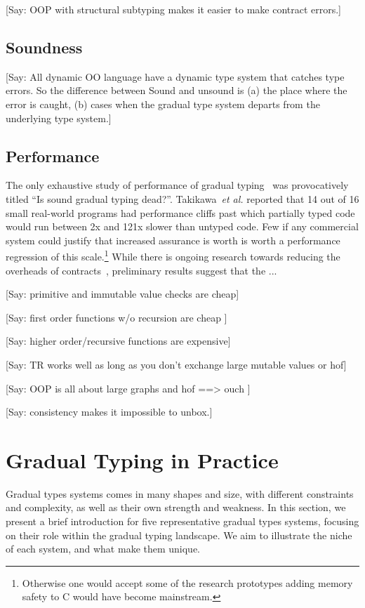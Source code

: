 \documentclass[a4paper,USenglish]{tex/lipics-v2016}
\begin{document}
[Say: OOP with structural subtyping makes it easier to make contract errors.]


\subsection{Soundness}

[Say: All dynamic OO language have a dynamic type system that catches type errors.  
So the difference between Sound and unsound is (a) the place where the error is caught, 
(b) cases when the gradual type system departs from the underlying type system.]  

\subsection{Performance}

The only exhaustive study of performance of gradual typing~\cite{popl16} was
provocatively titled ``Is sound gradual typing dead?''.  Takikawa~\emph{et
  al.}  reported that 14 out of 16 small real-world programs had performance
cliffs past which partially typed code would run between 2x and 121x slower
than untyped code. Few if any commercial system could justify that increased
assurance is worth is worth a performance regression of this
scale.\footnote{Otherwise one would accept some of the research prototypes
  adding memory safety to C would have become mainstream.} While there is
ongoing research towards reducing the overheads of
contracts~\cite{pycket15}, preliminary results suggest that the ...


[Say: primitive and immutable value checks are cheap]

[Say: first order functions w/o recursion are cheap ]

[Say: higher order/recursive functions are expensive]

[Say: TR works well as long as you don't exchange large mutable values or hof]

[Say: OOP is all about large graphs and hof ==> ouch ]

[Say: consistency makes it impossible to unbox.]

\section{Gradual Typing in Practice}

Gradual types systems comes in many shapes and size, with different
constraints and complexity, as well as their own strength and weakness. In
this section, we present a brief introduction for five representative
gradual types systems, focusing on their role within the gradual typing
landscape. We aim to illustrate the niche of each system, and what make them
unique.
\end{document}
